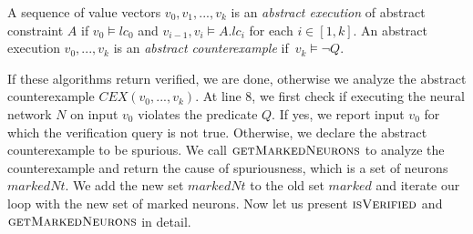 \begin{df}
  A sequence of value vectors ${v_0}, {v_1}, ... , {v_k}$ is an 
  {\em abstract execution} of abstract constraint $A$ if 
  ${v_0} \models lc_0$ and ${v_{i-1}}, {v_i} \models A.lc_i$ for each $i \in [1,k]$.  
  An abstract execution ${v_0,...,v_k}$ is
  an {\em abstract counterexample} if~${v_k} \models \lnot Q$.
\end{df}

If these algorithms return verified, we are done, otherwise we analyze the abstract counterexample $CEX(v_0,...,v_k)$.
At line 8, we first check if executing the neural network $N$ on input $v_0$
violates the predicate $Q$.
If yes, we report input $v_0$ for which the verification query is not true.
Otherwise, we declare the abstract counterexample to be spurious.
We call $\textsc{getMarkedNeurons}$ to analyze the counterexample and
return the cause of spuriousness, which is a set of neurons $markedNt$.
We add the new set $markedNt$ to the old set $marked$ and iterate our loop with the new set of marked neurons. Now let us present $\textsc{isVerified}$ and $\textsc{getMarkedNeurons}$ in detail.


%












